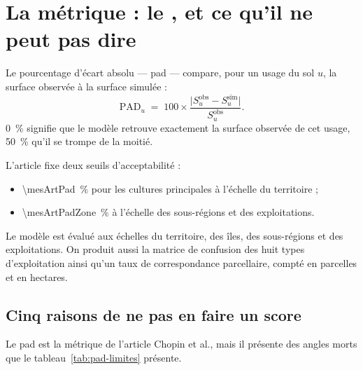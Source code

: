 \section{La métrique : le , et ce qu'il ne peut pas dire}
\label{sec:pad}

Le pourcentage d'écart absolu — \gls{pad} — compare, pour un usage du sol $u$, la surface
observée à la surface simulée \parencite[§2.6]{chopin2015} :
\begin{equation}
  \mathrm{PAD}_u \;=\; 100 \times \frac{\bigl| S^{\text{obs}}_u - S^{\text{sim}}_u \bigr|}
                                        {S^{\text{obs}}_u}.
  \label{eq:pad}
\end{equation}
\SI{0}{\percent} signifie que le modèle retrouve exactement la surface observée de cet usage,
\SI{50}{\percent} qu'il se trompe de la moitié.

L'article fixe deux seuils d'acceptabilité :

\begin{itemize}[leftmargin=1.2em]
  \item \SI{\mesArtPad}{\percent} pour les cultures principales à l'échelle du territoire ;
  \item \SI{\mesArtPadZone}{\percent} à l'échelle des sous-régions et des exploitations.
\end{itemize}

Le modèle est évalué aux échelles du territoire, des îles, des sous-régions et des
exploitations. On produit aussi la matrice de confusion des huit types d'exploitation ainsi
qu'un taux de correspondance parcellaire, compté en parcelles et en hectares.

\subsection*{Cinq raisons de ne pas en faire un score}

Le \gls{pad} est la métrique de l'article Chopin et al., mais il présente des angles morts que
le tableau~\ref{tab:pad-limites} présente.

